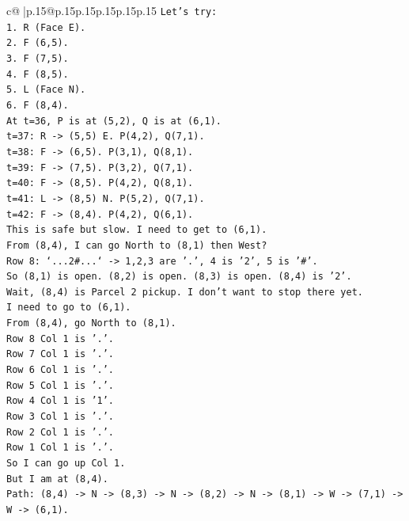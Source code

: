 \documentclass{article}
\begin{document}
{\begin{supertabular}{c@{$\;$}|p{.15\linewidth}@{}p{.15\linewidth}p{.15\linewidth}p{.15\linewidth}p{.15\linewidth}p{.15\linewidth}}
{{{\texttt{Let's try:} \\
\texttt{1. R (Face E).} \\
\texttt{2. F (6,5).} \\
\texttt{3. F (7,5).} \\
\texttt{4. F (8,5).} \\
\texttt{5. L (Face N).} \\
\texttt{6. F (8,4).} \\
\texttt{At t=36, P is at (5,2), Q is at (6,1).} \\
\texttt{t=37: R {-}> (5,5) E. P(4,2), Q(7,1).} \\
\texttt{t=38: F {-}> (6,5). P(3,1), Q(8,1).} \\
\texttt{t=39: F {-}> (7,5). P(3,2), Q(7,1).} \\
\texttt{t=40: F {-}> (8,5). P(4,2), Q(8,1).} \\
\texttt{t=41: L {-}> (8,5) N. P(5,2), Q(7,1).} \\
\texttt{t=42: F {-}> (8,4). P(4,2), Q(6,1).} \\
\texttt{This is safe but slow. I need to get to (6,1).} \\
\texttt{From (8,4), I can go North to (8,1) then West?} \\
\texttt{Row 8: `...2\#...` {-}> 1,2,3 are '.', 4 is '2', 5 is '\#'.} \\
\texttt{So (8,1) is open. (8,2) is open. (8,3) is open. (8,4) is '2'.} \\
\texttt{Wait, (8,4) is Parcel 2 pickup. I don't want to stop there yet.} \\
\texttt{I need to go to (6,1).} \\
\texttt{From (8,4), go North to (8,1).} \\
\texttt{Row 8 Col 1 is '.'.} \\
\texttt{Row 7 Col 1 is '.'.} \\
\texttt{Row 6 Col 1 is '.'.} \\
\texttt{Row 5 Col 1 is '.'.} \\
\texttt{Row 4 Col 1 is '1'.} \\
\texttt{Row 3 Col 1 is '.'.} \\
\texttt{Row 2 Col 1 is '.'.} \\
\texttt{Row 1 Col 1 is '.'.} \\
\texttt{So I can go up Col 1.} \\
\texttt{But I am at (8,4).} \\
\texttt{Path: (8,4) {-}> N {-}> (8,3) {-}> N {-}> (8,2) {-}> N {-}> (8,1) {-}> W {-}> (7,1) {-}> W {-}> (6,1).} \\
}}}
\end{supertabular}}
\end{document}
